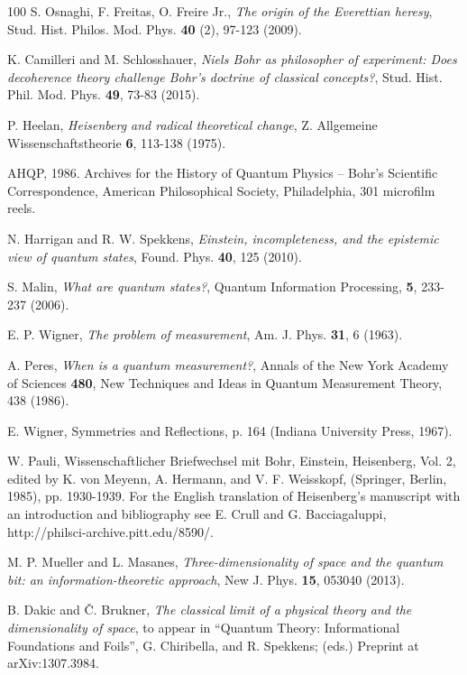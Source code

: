 \documentclass[12pt]{article}
\begin{document}
\begin {thebibliography}{100}
 S. Osnaghi, F. Freitas, O. Freire Jr., {\it The origin of the Everettian heresy}, Stud. Hist. Philos. Mod. Phys. {\bf 40} (2), 97-123 (2009).

 K. Camilleri and M. Schlosshauer, {\it Niels Bohr as philosopher of experiment: Does decoherence theory challenge Bohr's doctrine of classical concepts?}, Stud. Hist. Phil. Mod. Phys. {\bf 49}, 73-83 (2015).

 P. Heelan, {\it Heisenberg and radical theoretical change}, Z. Allgemeine Wissenschaftstheorie {\bf 6}, 113-138 (1975).

 AHQP, 1986. Archives for the History of Quantum Physics -- Bohr's Scientific Correspondence, American Philosophical Society, Philadelphia, 301 microfilm reels.

 N. Harrigan and R. W. Spekkens, {\it Einstein, incompleteness, and the epistemic view of quantum states}, Found. Phys. {\bf 40}, 125 (2010).

 S. Malin, {\it What are quantum states?}, Quantum Information Processing, {\bf 5}, 233-237 (2006).

 E. P. Wigner, {\it The problem of measurement}, Am. J. Phys. {\bf 31}, 6 (1963).

 A. Peres, {\it When is a quantum measurement?}, Annals of the New York Academy of Sciences {\bf 480}, New Techniques and Ideas in Quantum Measurement Theory, 438 (1986).

 E. Wigner, Symmetries and Reflections, p. 164 (Indiana University Press, 1967).

 W. Pauli, Wissenschaftlicher Briefwechsel mit Bohr, Einstein, Heisenberg, Vol. 2, edited by K. von Meyenn, A. Hermann, and V. F. Weisskopf, (Springer, Berlin, 1985), pp. 1930-1939.
For the English translation of Heisenberg's manuscript with an introduction and bibliography see E. Crull and G. Bacciagaluppi, http://philsci-archive.pitt.edu/8590/.

 M. P. Mueller and L. Masanes, {\it 
Three-dimensionality of space and the quantum bit: an information-theoretic approach}, New J. Phys. {\bf 15}, 053040 (2013).

 B. Dakic and {\v C}. Brukner, {\it The classical limit of a physical theory and the dimensionality of space}, to appear in ``Quantum Theory: Informational Foundations and Foils'', G. Chiribella, and R. Spekkens; (eds.)  Preprint at arXiv:1307.3984.


\end{thebibliography}
\end{document}
